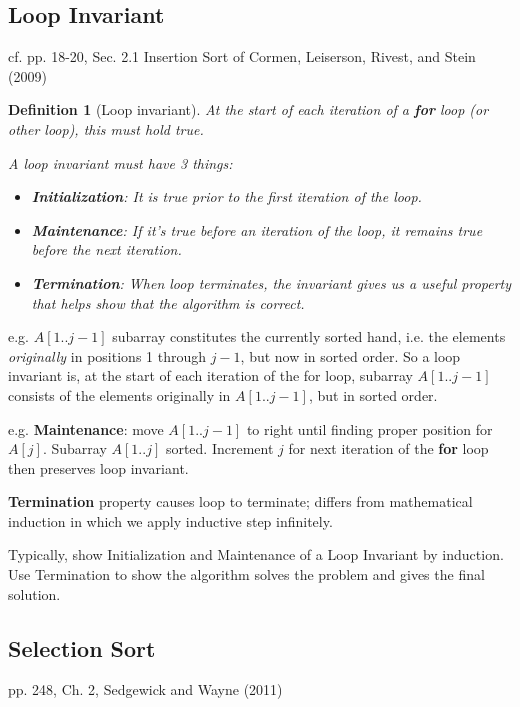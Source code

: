 \documentclass[10pt]{amsart}
\newtheorem{definition}{Definition}
\begin{document}
\begin{multicols*}{2}
\subsection{Loop Invariant}

cf. pp. 18-20, Sec. 2.1 Insertion Sort of Cormen, Leiserson, Rivest, and Stein (2009) \cite{CLRS2009}

\begin{definition}[Loop invariant]
	At the start of each iteration of a \textbf{for} loop (or other loop), this must hold true.
	
	A loop invariant must have 3 things:
	\begin{itemize}
		\item \textbf{Initialization}: It is true prior to the first iteration of the loop.
		\item \textbf{Maintenance}: If it's true before an iteration of the loop, it remains true before the next iteration.
		\item \textbf{Termination}: When loop terminates, the invariant gives us a useful property that helps show that the algorithm is correct.
	\end{itemize}
\end{definition}

e.g. $A[1.. j-1]$ subarray constitutes the currently sorted hand, i.e. the elements \emph{originally} in positions 1 through $j-1$, but now in sorted order. So a loop invariant is, at the start of each iteration of the for loop, subarray $A[1.. j-1]$ consists of the elements originally in $A[1..j-1]$, but in sorted order.

e.g. \textbf{Maintenance}: move $A[1..j-1]$ to right until finding proper position for $A[j]$. Subarray $A[1..j]$ sorted. Increment $j$ for next iteration of the \textbf{for} loop then preserves loop invariant.

\textbf{Termination} property causes loop to terminate; differs from mathematical induction in which we apply inductive step infinitely.

Typically, show Initialization and Maintenance of a Loop Invariant by induction. Use Termination to show the algorithm solves the problem and gives the final solution.

\subsection{Selection Sort}

pp. 248, Ch. 2, Sedgewick and Wayne (2011) \cite{SeWa2011}


\end{multicols*}
\end{document}
